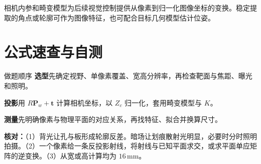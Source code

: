相机内参和畸变模型为后续视觉控制提供从像素到归一化图像坐标的变换。稳定提取的角点或轮廓可作为图像特征，也可配合目标几何模型估计位姿。

\section{公式速查与自测}

\begin{focusbox}{做题顺序}
\textbf{选型}先确定视野、单像素覆盖、宽高分辨率，再检查靶面与焦距、曝光和照明。\par
\textbf{投影}用 $R\mathbf P_w+\mathbf t$ 计算相机坐标，以 $Z_c$ 归一化，套用畸变模型与 $K$。\par
\textbf{测量}先明确像素与物理平面的对应关系，再找特征、拟合并换算尺寸。
\end{focusbox}

\noindent\textbf{核对：}（1）背光让孔与板形成轮廓反差。暗场让划痕散射光明显，必要时分时照明拍摄。（2）一个像素给一条反投影射线，将射线与已知平面求交，或求平面单应矩阵的逆变换。（3）从宽或高计算均为 $16\,\mathrm{mm}$。
